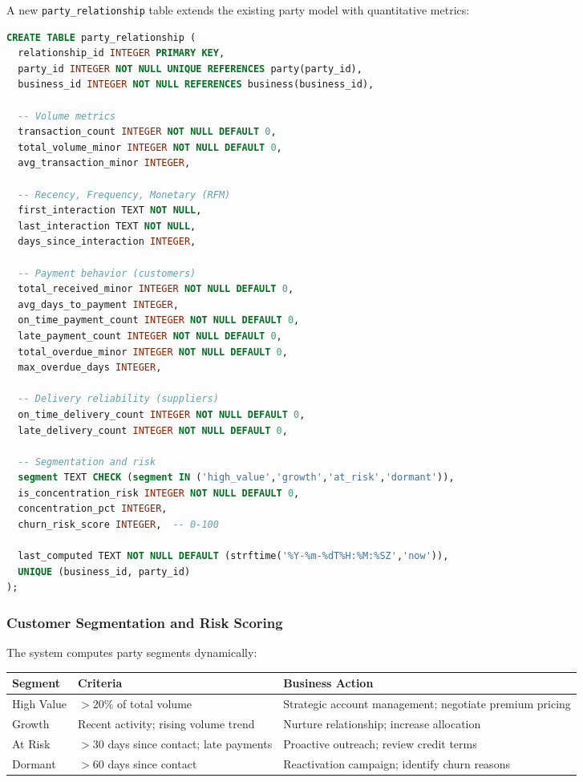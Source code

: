 \documentclass[10pt,a4paper]{article}
\newcommand{\code}[1]{\texttt{\small #1}}
\begin{document}
A new \code{party\_relationship} table extends the existing party model with quantitative metrics:

\begin{lstlisting}[language=SQL,caption={Party relationship entity}]
CREATE TABLE party_relationship (
  relationship_id INTEGER PRIMARY KEY,
  party_id INTEGER NOT NULL UNIQUE REFERENCES party(party_id),
  business_id INTEGER NOT NULL REFERENCES business(business_id),
  
  -- Volume metrics
  transaction_count INTEGER NOT NULL DEFAULT 0,
  total_volume_minor INTEGER NOT NULL DEFAULT 0,
  avg_transaction_minor INTEGER,
  
  -- Recency, Frequency, Monetary (RFM)
  first_interaction TEXT NOT NULL,
  last_interaction TEXT NOT NULL,
  days_since_interaction INTEGER,
  
  -- Payment behavior (customers)
  total_received_minor INTEGER NOT NULL DEFAULT 0,
  avg_days_to_payment INTEGER,
  on_time_payment_count INTEGER NOT NULL DEFAULT 0,
  late_payment_count INTEGER NOT NULL DEFAULT 0,
  total_overdue_minor INTEGER NOT NULL DEFAULT 0,
  max_overdue_days INTEGER,
  
  -- Delivery reliability (suppliers)
  on_time_delivery_count INTEGER NOT NULL DEFAULT 0,
  late_delivery_count INTEGER NOT NULL DEFAULT 0,
  
  -- Segmentation and risk
  segment TEXT CHECK (segment IN ('high_value','growth','at_risk','dormant')),
  is_concentration_risk INTEGER NOT NULL DEFAULT 0,
  concentration_pct INTEGER,
  churn_risk_score INTEGER,  -- 0-100
  
  last_computed TEXT NOT NULL DEFAULT (strftime('%Y-%m-%dT%H:%M:%SZ','now')),
  UNIQUE (business_id, party_id)
);
\end{lstlisting}

\subsubsection{Customer Segmentation and Risk Scoring}

The system computes party segments dynamically:

\begin{center}
\begin{tabularx}{\textwidth}{@{}p{2.4cm}p{4.0cm}Y@{}}
\toprule
\textbf{Segment} & \textbf{Criteria} & \textbf{Business Action}\\
\midrule
High Value & $>20\%$ of total volume & Strategic account management; negotiate premium pricing\\
Growth & Recent activity; rising volume trend & Nurture relationship; increase allocation\\
At Risk & $>30$ days since contact; late payments & Proactive outreach; review credit terms\\
Dormant & $>60$ days since contact & Reactivation campaign; identify churn reasons\\
\bottomrule
\end{tabularx}
\end{center}
\end{document}
